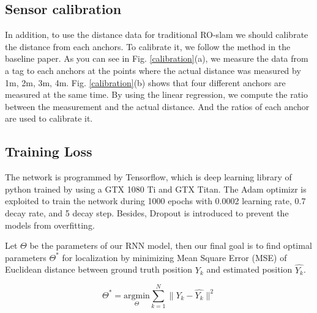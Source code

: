 \documentclass{ieeeaccess}
\begin{document}
\subsection{Sensor calibration}
In addition, to use the distance data for traditional RO-slam we should calibrate the distance from each anchors. To calibrate it, we follow the method in the baseline paper. As you can see in Fig. \ref{calibration}(a), we measure the data from a tag to each anchors at the points where the actual distance was measured by 1m, 2m, 3m, 4m. Fig. \ref{calibration}(b) shows that four different anchors are measured at the same time. By using the linear regression, we compute the ratio between the measurement and the actual distance. And the ratios of each anchor are used to calibrate it.

\subsection{Training Loss}
The network is programmed by Tensorflow, which is deep learning library of python trained by using a GTX 1080 Ti and GTX Titan. The Adam optimizr is exploited to train the network during 1000 epochs with 0.0002 learning rate, 0.7 decay rate, and 5 decay step. Besides, Dropout is introduced to prevent the models from overfitting. 

Let $\Theta$ be the parameters of our RNN model, then our final goal is to find optimal parameters $\Theta^{*}$ for localization by minimizing Mean Square Error (MSE) of Euclidean distance between ground truth position $Y_k$ and estimated position $\hat{Y_k}$.

\begin{equation}
\Theta^{*} = \underset{\Theta}{\mathrm{argmin}} \sum_{k=1}^N \parallel Y_k - \hat{Y_k} \parallel^{2}
\end{equation}
\end{document}
